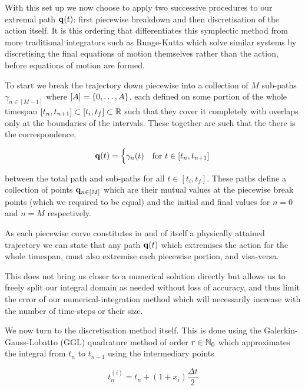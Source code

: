 With this set up we now choose to apply two successive procedures to our extremal path $\vb q(t)$: first piecewise breakdown and then discretisation of the action itself. It is this ordering that differentiates this symplectic method from more traditional integrators such as Runge-Kutta \cite{devriesFirstCourseComputational2011} which solve similar systems by discretising the final equations of motion themselves rather than the action, before equations of motion are formed.

To start we break the trajectory down piecewise into a collection of $M$ sub-paths $\gamma_{n \in [M - 1]}$ where $[A] = \left\{0, \dots, A\right\}$, each defined on some portion of the whole timespan $[t_n, t_{n + 1}] \subset [t_i, t_f] \subset \mathbb{R}$ such that they cover it completely with overlaps only at the boundaries of the intervals. These together are such that the there is the correspondence,

\begin{equation}
\label{eq:pw-traj}
	\vb q(t) = \begin{cases}
		\gamma_n(t) &\text{for~} t \in [t_n, t_{n + 1}]
	\end{cases}
\end{equation}

between the total path and sub-paths for all $t \in [t_i, t_f]$. These paths define a collection of points $\vb q_{n \in [M]}$ which are their mutual values at the piecewise break points (which we required to be equal) and the initial and final values for $n = 0$ and $n = M$ respectively.

As each piecewise curve constitutes in and of itself a physically attained trajectory we can state that any path $\vb{q}(t)$ which extremises the action for the whole timespan, must also extremise each piecewise portion, and visa-versa. 

This does not bring us closer to a numerical solution directly but allows us to freely split our integral domain as needed without loss of accuracy, and thus limit the error of our numerical-integration method which will necessarily increase with the number of time-steps or their size.

We now turn to the discretisation method itself. This is done using the Galerkin-Gauss-Lobatto (GGL) quadrature method of order $r \in \mathbb{N}_0$\cite{tsangSLIMPLECTICINTEGRATORSVARIATIONAL2015, farrVariationalIntegratorsGravitational2007} which approximates the integral from $t_n$ to $t_{n + 1}$ using the intermediary points

\begin{equation}
  t^{(i)}_n = t_n + (1 + x_i)\frac{\Delta t}{2}
\end{equation}


